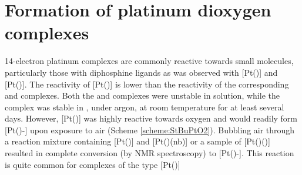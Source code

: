 
\section{Formation of platinum dioxygen complexes}

14-electron platinum complexes are commonly reactive towards small molecules, particularly those with diphosphine ligands as was observed with [Pt(\tBusixantphos)] and [Pt(\tBuxantphos)].  The reactivity of [Pt(\tButhixantphos)] is lower than the reactivity of the corresponding \tBusixantphos{} and \tBuxantphos{} complexes.  Both the \tBusixantphos{} and \tBuxantphos{} complexes were unstable in solution, while the \tButhixantphos{} complex was stable in , under argon, at room temperature for at least several days.  However, [Pt(\tButhixantphos)] was highly reactive towards oxygen and would readily form [Pt(\tButhixantphos)\hapto{}-] upon exposure to air (Scheme \ref{scheme:StBuPtO2}).  Bubbling air through a reaction mixture containing [Pt(\tButhixantphos)] and [Pt(\tButhixantphos)(nb)] or a sample of [Pt(\tButhixantphos)()] resulted in complete conversion (by \phosphorus{} NMR spectroscopy) to [Pt(\tButhixantphos)\hapto{}-].  This reaction is quite common for complexes of the type [Pt()]\cite{Goel1983b, Yoshida1977}

